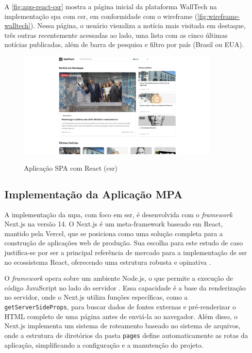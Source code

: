 A \autoref{fig:app-react-csr} mostra a página inicial da plataforma WallTech na implementação \acrshort{spa} com \acrshort{csr}, em conformidade com o wireframe (\autoref{fig:wireframe-walltech}). Nessa página, o usuário visualiza a notícia mais visitada em destaque, três outras recentemente acessadas ao lado, uma lista com as cinco últimas notícias publicadas, além de barra de pesquisa e filtro por país (Brasil ou EUA).

\begin{figure}[H]
  \centering
  \caption{Aplicação SPA com React (\acrshort{csr})}
  \includegraphics[width=0.9\textwidth]{media/app_react_csr.png}
  \label{fig:app-react-csr}
\end{figure}

\subsection{Implementação da Aplicação MPA}
\label{ssec:implementacao_mpa}

A implementação da \acrfull{mpa}, com foco em \acrfull{ssr}, é desenvolvida com o \emph{framework} Next.js na versão 14. O Next.js é um meta-framework baseado em React, mantido pela Vercel, que se posiciona como uma solução completa para a construção de aplicações web de produção. Sua escolha para este estudo de caso justifica-se por ser a principal referência de mercado para a implementação de \acrshort{ssr} no ecossistema React, oferecendo uma estrutura robusta e opinativa \cite{nextjs2024}.

O \emph{framework} opera sobre um ambiente Node.js, o que permite a execução de código JavaScript no lado do servidor \cite{nodejs2025}. Essa capacidade é a base da renderização no servidor, onde o Next.js utiliza funções específicas, como a \texttt{getServerSideProps}, para buscar dados de fontes externas e pré-renderizar o HTML completo de uma página antes de enviá-la ao navegador. Além disso, o Next.js implementa um sistema de roteamento baseado no sistema de arquivos, onde a estrutura de diretórios da pasta \texttt{pages} define automaticamente as rotas da aplicação, simplificando a configuração e a manutenção do projeto.


